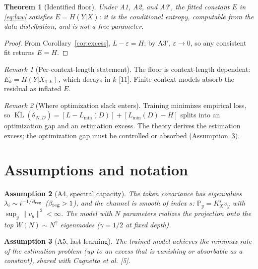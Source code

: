 \documentclass[12pt]{article}
\newcommand{\eps}{\varepsilon}
\newcommand{\KL}{\operatorname{KL}}
\newcommand{\Prob}{\mathbb{P}}
\newtheorem{theorem}{Theorem}[section]
\newtheorem{assumption}[theorem]{Assumption}
\theoremstyle{remark}
\newtheorem{remark}{Remark}
\begin{document}
\begin{theorem}[Identified floor]
\label{thm:identified}
Under A1, A2, and A3$'$, the fitted constant $E$ in \eqref{eq:law} satisfies
$E=H(Y|X)$: it is the conditional entropy, computable from the data
distribution, and is not a free parameter.
\end{theorem}

\begin{proof}
From Corollary~\ref{cor:excess}, $L-\eps=H$; by A3$'$, $\eps\to0$, so any
consistent fit returns $E=H$.
\end{proof}

\begin{remark}[Per-context-length statement]
\label{rem:perlength}
The floor is context-length dependent: $E_k=H(Y|X_{1:k})$, which decays in $k$
[11].  Finite-context models absorb the residual as inflated
$E$.
\end{remark}

\begin{remark}[Where optimization slack enters]
\label{rem:slack}
Training minimizes empirical loss, so
$\overline{\KL}(\theta_{N,D})=[L-L_{\min}(D)]+[L_{\min}(D)-H]$ splits into an
optimization gap and an estimation excess.  The theory derives the estimation
excess; the optimization gap must be controlled or absorbed
(Assumption~\ref{ass:fastlearn}).
\end{remark}

\section{Assumptions and notation}
\label{sec:assumptions}

\begin{assumption}[A4, spectral capacity]
\label{ass:spectral}
The token covariance has eigenvalues $\lambda_i\sim i^{-1/\beta_{\rm reg}}$
($\beta_{\rm reg}>1$), and the channel is smooth of index $s$:
$\Prob_{y}=K_X^s v_y$ with $\sup_y\|v_y\|^2<\infty$.  The model with $N$
parameters realizes the projection onto the top $W(N)\!\sim\!N^{\gamma}$
eigenmodes ($\gamma\!=\!1/2$ at fixed depth).
\end{assumption}

\begin{assumption}[A5, fast learning]
\label{ass:fastlearn}
The trained model achieves the minimax rate of the estimation problem
(up to an excess that is vanishing or absorbable as a constant), shared with
Cagnetta et al. [5].
\end{assumption}
\end{document}
